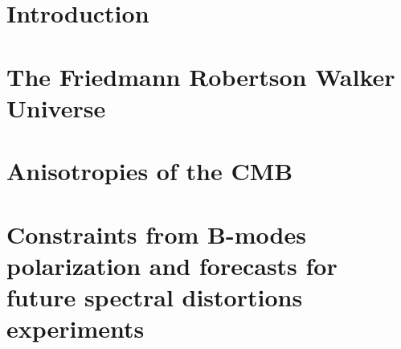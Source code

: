 \documentclass[12pt,a4paper]{book}
\begin{document}
\frontmatter 

\null\thispagestyle{empty}
\newpage
\thispagestyle{empty}
\vspace*{\fill}
\begin{minipage}[t]{0.9\textwidth}
\end{minipage}
\vspace*{5cm}
\newpage
\null\thispagestyle{empty}
\newpage

 
\tableofcontents

\mainmatter
\setlength{\parskip}{.5em} %
\chapter*{Introduction}

\chapter{The Friedmann Robertson Walker Universe}








\chapter{Anisotropies of the CMB}
\label{chap:anisotropies}




\chapter{Constraints from B-modes polarization and forecasts
 for future spectral distortions experiments}


\end{document}
